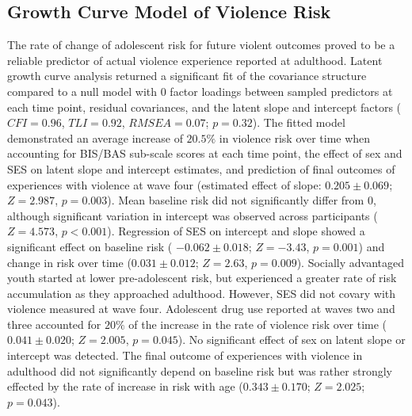 \documentclass[utf8]{article}
\begin{document}
\subsection{Growth Curve Model of Violence Risk} The rate of change of adolescent risk for future violent outcomes proved to be a reliable predictor of actual violence experience reported at adulthood. Latent growth curve analysis returned a significant fit of the covariance structure compared to a null model with 0 factor loadings between sampled predictors at each time point, residual covariances, and the latent slope and intercept factors ($CFI = 0.96$, $TLI = 0.92$, $RMSEA = 0.07$; $p = 0.32$). The fitted model demonstrated an average increase of $20.5\%$ in violence risk over time when accounting for BIS/BAS sub-scale scores at each time point, the effect of sex and SES on latent slope and intercept estimates, and prediction of final outcomes of experiences with violence at wave four (estimated effect of slope: $0.205\pm0.069$; $Z=2.987$, $p=0.003$). Mean baseline risk did not significantly differ from $0$, although significant variation in intercept was observed across participants ($Z=4.573$, $p<0.001$). Regression of SES on intercept and slope showed a significant effect on baseline risk ( $-0.062\pm0.018$; $Z=-3.43$, $p=0.001$) and change in risk over time ($0.031\pm0.012$; $Z=2.63$, $p=0.009$). Socially advantaged youth started at lower pre-adolescent risk, but experienced a greater rate of risk accumulation as they approached adulthood. However, SES did not covary with violence measured at wave four. Adolescent drug use reported at waves two and three accounted for $20\%$ of the increase in the rate of violence risk over time ($0.041\pm0.020$; $Z=2.005$, $p=0.045$). No significant effect of sex on latent slope or intercept was detected. The final outcome of experiences with violence in adulthood did not significantly depend on baseline risk but was rather strongly effected by the rate of increase in risk with age ($0.343\pm0.170$; $Z=2.025$; $p=0.043$). 
\end{document}
